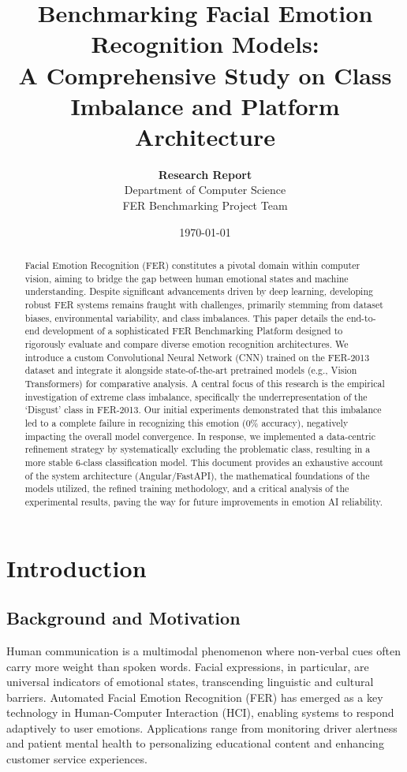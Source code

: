 \documentclass[a4paper,12pt]{article}
\title{\textbf{Benchmarking Facial Emotion Recognition Models: \\ A Comprehensive Study on Class Imbalance and Platform Architecture}}
\author{
    \textbf{Research Report} \\
    Department of Computer Science \\
    FER Benchmarking Project Team
}
\date{\today}
\begin{document}
\maketitle
\tableofcontents
\newpage

\begin{abstract}
Facial Emotion Recognition (FER) constitutes a pivotal domain within computer vision, aiming to bridge the gap between human emotional states and machine understanding. Despite significant advancements driven by deep learning, developing robust FER systems remains fraught with challenges, primarily stemming from dataset biases, environmental variability, and class imbalances. This paper details the end-to-end development of a sophisticated FER Benchmarking Platform designed to rigorously evaluate and compare diverse emotion recognition architectures. We introduce a custom Convolutional Neural Network (CNN) trained on the FER-2013 dataset and integrate it alongside state-of-the-art pretrained models (e.g., Vision Transformers) for comparative analysis. A central focus of this research is the empirical investigation of extreme class imbalance, specifically the underrepresentation of the `Disgust' class in FER-2013. Our initial experiments demonstrated that this imbalance led to a complete failure in recognizing this emotion (0\% accuracy), negatively impacting the overall model convergence. In response, we implemented a data-centric refinement strategy by systematically excluding the problematic class, resulting in a more stable 6-class classification model. This document provides an exhaustive account of the system architecture (Angular/FastAPI), the mathematical foundations of the models utilized, the refined training methodology, and a critical analysis of the experimental results, paving the way for future improvements in emotion AI reliability.
\end{abstract}

\section{Introduction}

\subsection{Background and Motivation}
Human communication is a multimodal phenomenon where non-verbal cues often carry more weight than spoken words. Facial expressions, in particular, are universal indicators of emotional states, transcending linguistic and cultural barriers. Automated Facial Emotion Recognition (FER) has emerged as a key technology in Human-Computer Interaction (HCI), enabling systems to respond adaptively to user emotions. Applications range from monitoring driver alertness and patient mental health to personalizing educational content and enhancing customer service experiences.
\end{document}
